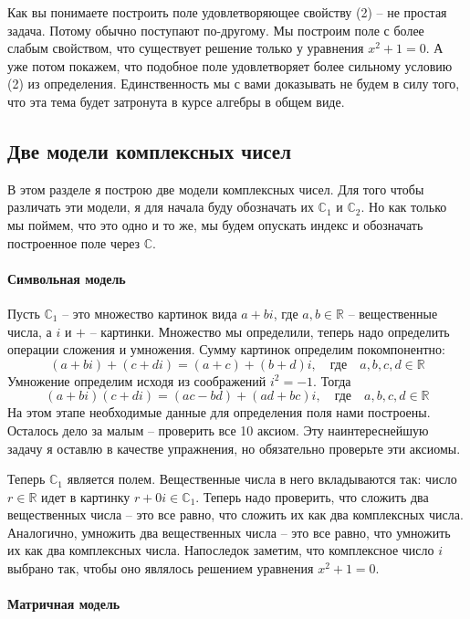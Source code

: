 Как вы понимаете построить поле удовлетворяющее свойству (2) -- не простая задача.
Потому обычно поступают по-другому.
Мы построим поле с более слабым свойством, что существует решение только у уравнения $x^2 + 1 = 0$.
А уже потом покажем, что подобное поле удовлетворяет более сильному условию (2) из определения.
Единственность мы с вами доказывать не будем в силу того, что эта тема будет затронута в курсе алгебры в общем виде.

\subsection{Две модели комплексных чисел}
\label{subsection::ComplexModels}

В этом разделе я построю две модели комплексных чисел.
Для того чтобы различать эти модели, я для начала буду обозначать их $\mathbb C_1$ и $\mathbb C_2$.
Но как только мы поймем, что это одно и то же, мы будем опускать индекс и обозначать построенное поле через $\mathbb C$.

\paragraph{Символьная модель}

Пусть $\mathbb C_1$ -- это множество картинок вида $a+bi$, где $a,b\in\mathbb R$ -- вещественные числа, а $i$ и $+$ -- картинки.
Множество мы определили, теперь надо определить операции сложения и умножения.
Сумму картинок определим покомпонентно:
\[
(a+bi) + (c+di) = (a+c) + (b+d) i, \quad\text{где}\quad a,b,c,d\in\mathbb R
\]
Умножение определим исходя из соображений $i^2 = -1$.
Тогда
\[
(a+bi)(c+di) = (ac - bd) + (ad + bc)i,\quad\text{где}\quad a,b,c,d\in\mathbb R
\]
На этом этапе необходимые данные для определения поля нами построены.
Осталось дело за малым -- проверить все 10 аксиом.
Эту наинтереснейшую задачу я оставлю в качестве упражнения, но обязательно проверьте эти аксиомы.

Теперь $\mathbb C_1$ является полем.
Вещественные числа в него вкладываются так: число $r\in\mathbb R$ идет в картинку $r + 0 i\in\mathbb C_1$.
Теперь надо проверить, что сложить два вещественных числа -- это все равно, что сложить их как два комплексных числа.
Аналогично, умножить два вещественных числа -- это все равно, что умножить их как два комплексных числа.
Напоследок заметим, что комплексное число $i$ выбрано так, чтобы оно являлось решением уравнения $x^2 + 1 = 0$.

\paragraph{Матричная модель}

